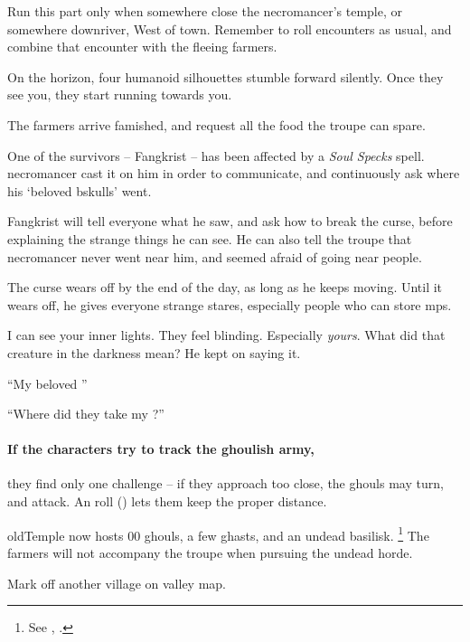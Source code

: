 Run this part only when somewhere close the \gls{necromancer}'s temple, or somewhere downriver, West of \gls{town}.
Remember to roll encounters as usual, and combine that encounter with the fleeing farmers.

\begin{boxtext}
  On the horizon, four humanoid silhouettes stumble forward silently.
  Once they see you, they start running towards you.
\end{boxtext}

The farmers arrive famished, and request all the food the troupe can spare.

One of the survivors -- Fangkrist -- has been affected by a \textit{Soul Specks} spell.
\Gls{necromancer} cast it on him in order to communicate, and continuously ask where his `beloved \gls{bskulls}' went.

Fangkrist will tell everyone what he saw, and ask how to break the curse, before explaining the strange things he can see.
He can also tell the troupe that \gls{necromancer} never went near him, and seemed afraid of going near people.

The curse wears off by the end of the day, as long as he keeps moving.
Until it wears off, he gives everyone strange stares, especially people who can store \glspl{mp}.

\begin{speechtext}
  I can see your inner lights.
  They feel blinding.
  Especially \emph{yours}.%
  What did that creature in the darkness mean?
  He kept on saying it.

  ``My beloved ''

  ``Where did they take my ?''
\end{speechtext}

\paragraph{If the characters try to track the ghoulish army,}
they find only one challenge -- if they approach too close, the ghouls may turn, and attack.
An  roll (\tn[10]) lets them keep the proper distance.

\Gls{oldTemple} now hosts 00 ghouls, a few ghasts, and an undead \gls{basilisk}.%
\footnote{See , .}
The farmers will not accompany the troupe when pursuing the undead horde.

Mark off another \gls{village} on \gls{valley} map.

